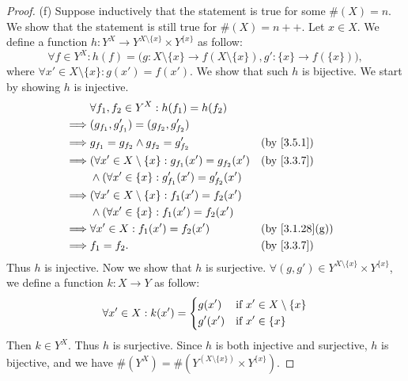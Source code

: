 \begin{proof}{(f)}
  Suppose inductively that the statement is true for some \(\#(X) = n\).
  We show that the statement is still true for \(\#(X) = n++\).
  Let \(x \in X\).
  We define a function \(h : Y^X \to Y^{X \setminus \{x\}} \times Y^{\{x\}}\) as follow:
  \[
    \forall f \in Y^X : h(f) = \bigg(g : X \setminus \{x\} \to f(X \setminus \{x\}), g' : \{x\} \to f(\{x\})\bigg),
  \]
  where \(\forall x' \in X \setminus \{x\} : g(x') = f(x')\).
  We show that such \(h\) is bijective.
  We start by showing \(h\) is injective.
  \begin{align*}
             & \forall f_1, f_2 \in Y^X : h(f_1) = h(f_2)                                                      \\
    \implies & (g_{f_1}, g_{f_1}') = (g_{f_2}, g_{f_2}')                                                       \\
    \implies & g_{f_1} = g_{f_2} \land g_{f_2} = g_{f_2}'                    &  & \by{3.5.1}                   \\
    \implies & (\forall x' \in X \setminus \{x\} : g_{f_1}(x') = g_{f_2}(x') &  & \by{3.3.7}                   \\
             & \land (\forall x' \in \{x\} : g_{f_1}'(x') = g_{f_2}'(x')                                       \\
    \implies & (\forall x' \in X \setminus \{x\} : f_1(x') = f_2(x')                                           \\
             & \land (\forall x' \in \{x\} : f_1(x') = f_2(x')                                                 \\
    \implies & \forall x' \in X : f_1(x') = f_2(x')                          &  & \text{(by \cref{3.1.28}(g))} \\
    \implies & f_1 = f_2.                                                    &  & \by{3.3.7}
  \end{align*}
  Thus \(h\) is injective.
  Now we show that \(h\) is surjective.
  \(\forall (g, g') \in Y^{X \setminus \{x\}} \times Y^{\{x\}}\), we define a function \(k : X \to Y\) as follow:
  \[
    \forall x' \in X : k(x') = \begin{dcases}
      g(x')  & \text{if } x' \in X \setminus \{x\} \\
      g'(x') & \text{if } x' \in \{x\}
    \end{dcases}
  \]
  Then \(k \in Y^X\).
  Thus \(h\) is surjective.
  Since \(h\) is both injective and surjective, \(h\) is bijective, and we have \(\#(Y^X) = \#(Y^{(X \setminus \{x\})} \times Y^{\{x\}})\).

\end{proof}
